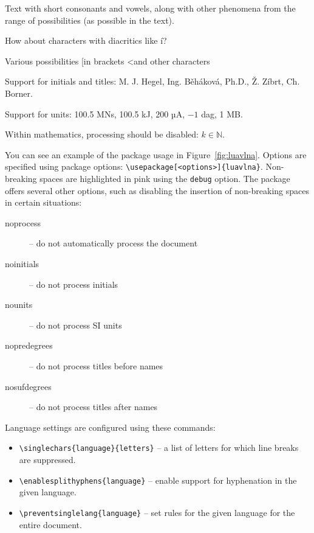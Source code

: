 \documentclass{ltugboat}
\begin{document}
\begin{figure*}
  \begin{minipage}{3in}

    \preventsingledebugon

    Text with short consonants and vowels, along with other phenomena from the range of possibilities (as possible in the text).

    How about characters with diacritics like í?

    Various possibilities [in brackets \textless and other characters

    Support for initials and titles: M. J. Hegel, Ing. Běháková, Ph.D., Ž. Zíbrt, Ch. Borner.

    Support for units: 100.5 MN\cdot{}s, 100.5 kJ, 200 µA, $-1$ dag, 1 MB. 

    Within mathematics, processing should be disabled: $k \in \mathbb N$.

    \preventsingledebugoff
  \end{minipage}
  \caption{Example use of the Luavlna package}\label{fig:luavlna}
\end{figure*}

You can see an example of the package usage in Figure~\ref{fig:luavlna}.
Options are specified using package options:
\verb|\usepackage[<options>]{luavlna}|. Non-breaking spaces are highlighted in
pink using the \texttt{debug} option. The package offers several other options,
such as disabling the insertion of non-breaking spaces in certain situations:

\begin{description}
  \item [noprocess] – do not automatically process the document
  \item [noinitials] – do not process initials
  \item [nounits] – do not process SI units
  \item [nopredegrees] – do not process titles before names
  \item [nosufdegrees] – do not process titles after names
\end{description}

Language settings are configured using these commands:

\begin{itemize}
  \item\verb|\singlechars{language}{letters}| – a list of letters for which line breaks are suppressed.
  \item\verb|\enablesplithyphens{language}| – enable support for hyphenation in the given language.
  \item\verb|\preventsinglelang{language}| – set rules for the given language for the entire document.
\end{itemize}
\end{document}
